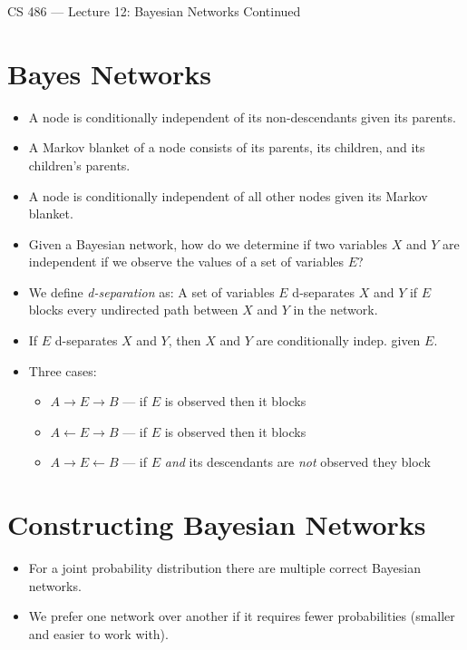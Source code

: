 \documentclass{article}
\author{Clement Tsang}
\begin{document}
\begin{center}
    \Large{CS 486 --- Lecture 12: Bayesian Networks Continued}
\end{center}

\section{Bayes Networks}
\begin{itemize}
    \item A node is conditionally independent of its non-descendants given its parents.
    \item A Markov blanket of a node consists of its parents, its children, and its children's parents.
    \item A node is conditionally independent of all other nodes given its Markov blanket.
    \item Given a Bayesian network, how do we determine if two variables $X$ and $Y$ are independent if we observe the values of a set of variables $E$?
    \item We define \emph{d-separation} as: A set of variables $E$ d-separates $X$ and $Y$ if $E$ blocks every undirected path between $X$ and $Y$ in the network.
    \item If $E$ d-separates $X$ and $Y$, then $X$ and $Y$ are conditionally indep. given $E$.
    \item Three cases:
        \begin{itemize}
            \item $A \rightarrow E \rightarrow B$ --- if $E$ is observed then it blocks 
            \item $A \leftarrow E \rightarrow B$ --- if $E$ is observed then it blocks
            \item $A \rightarrow E \leftarrow B$ --- if $E$ \emph{and} its descendants are \emph{not} observed they block
        \end{itemize}
\end{itemize}

\section{Constructing Bayesian Networks}
\begin{itemize}
    \item For a joint probability distribution there are multiple correct Bayesian networks.
    \item We prefer one network over another if it requires fewer probabilities (smaller and easier to work with).
\end{itemize}
\end{document}
